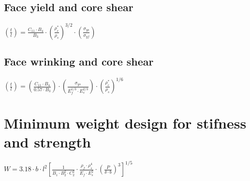 \documentclass[12pt]{article}
\begin{document}
\subsection{Face yield and core shear}
\Large
\indent $
(\frac{t}{l}) =
\frac{C_{11}\cdot B_4}{B_3}
\cdot (\frac{\rho_c^*}{\rho_s})^{3/2}
\cdot (\frac{\sigma_{ys}}{\sigma_{yf}})
$\\

\normalsize
\subsection{Face wrinking and core shear}


\Large
\indent
$(\frac{t}{l}) =
(\frac{C_{11} \cdot B_4}{0.57 \cdot B_3})
\cdot (\frac{\sigma_{ys}}{E^{1/3}_f \cdot E^{2/3}_s})
\cdot (\frac{\rho_c^*}{\rho_s})^{1/6}
$
\normalsize

\section{Minimum weight design for stifness and strength}
\vspace{0.5cm}
\Large

$W=3.18\cdot b \cdot l^2 [\frac{1}{B_1 \cdot B^2_2\cdot C_2^2} \cdot \frac{\rho_f \cdot \rho_s^4}{E_f \cdot E_s^2} \cdot (\frac{P}{\delta \cdot b}   )^3    ] ^{1/5}$ 
\end{document}
